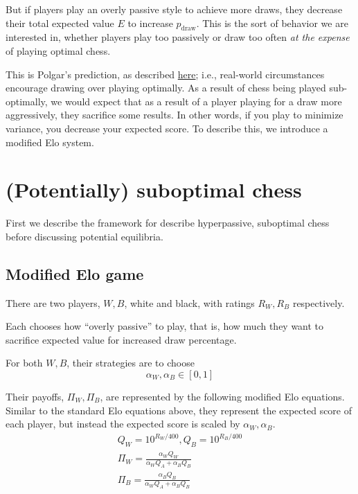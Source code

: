 \documentclass{article}
\begin{document}
But if players play an overly passive style to achieve more draws,
they decrease their total expected value $E$ to increase $p_{\text{draw}}$.
This is the sort of behavior we are interested in, whether players play
too passively or draw too often \textit{at the expense} of playing optimal chess.

This is Polgar's prediction, as described \href{https://chessdailynews.com/the-700-lbs-gorilla-issue-to-draw-or-not-to-draw/}{here}; i.e., real-world circumstances encourage drawing over playing optimally.
As a result of chess being played sub-optimally, we would expect that as a result of a player playing for a draw more aggressively,
they sacrifice some results. In other words, if you play to minimize variance, you decrease your expected score.
To describe this, we introduce a modified Elo system.

\section{(Potentially) suboptimal chess}

First we describe the framework for describe hyperpassive, suboptimal chess before discussing potential equilibria.

\subsection{Modified Elo game}

There are two players, $W, B$, white and black, with ratings $R_W,R_B$ respectively.

Each chooses how ``overly passive'' to play, that is, how much they want to
sacrifice expected value for increased draw percentage.

For both $W,B$, their strategies are to choose $$\alpha_W, \alpha_B \in [0,1]$$

Their payoffs, $\Pi_W,\Pi_B$, are represented by the following modified Elo equations.
Similar to the standard Elo equations above, they represent the expected score of each player,
but instead the expected score is scaled by $\alpha_W, \alpha_B$.
\begin{gather*}
    Q_W = 10^{R_W/400}, Q_B = 10^{R_B/400} \\
    \Pi_W = \frac{\alpha_W Q_W}{\alpha_W Q_A+\alpha_B Q_B}
    \\
    \Pi_B = \frac{\alpha_B Q_B}{\alpha_W Q_A+\alpha_B Q_B}
\end{gather*}
\end{document}
